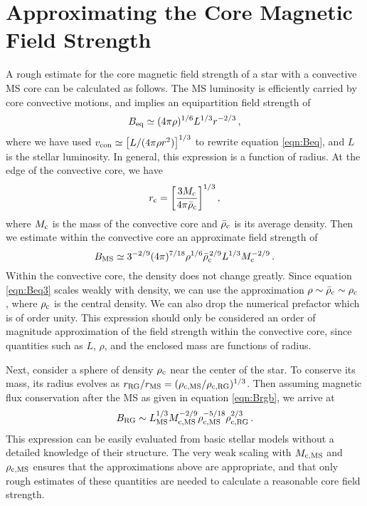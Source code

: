 \section{Approximating the Core Magnetic Field Strength}
\label{Bcenap}

A rough estimate for the core magnetic field strength of a star with a convective MS core can be calculated as follows. The MS luminosity is efficiently carried by core convective motions, and implies an equipartition field strength of 
\begin{equation}
\label{eqn:Beq2}
B_{\rm eq} \simeq (4 \pi \rho)^{1/6} L^{1/3} r^{-2/3} \, ,
\end{equation}
where we have used $v_{\rm con} \simeq \big[L/(4 \pi \rho r^2)\big]^{1/3}$ to rewrite equation \ref{eqn:Beq}, and $L$ is the stellar luminosity. In general, this expression is a function of radius. At the edge of the convective core, we have
\begin{equation}
\label{eqn:rc}
r_{\rm c} = \bigg[ \frac{3 M_{\rm c}}{4 \pi {\bar \rho}_{\rm c}} \bigg]^{1/3} \, ,
\end{equation}
where $M_{\rm c}$ is the mass of the convective core and ${\bar \rho}_{\rm c}$ is its average density. Then we estimate within the convective core an approximate field strength of
\begin{equation}
\label{eqn:Beq3}
B_{\rm MS} \simeq 3^{-2/9} (4 \pi)^{7/18} \rho^{1/6} {\bar \rho}_{\rm c}^{\, 2/9} L^{1/3} M_{\rm c}^{-2/9} \, .
\end{equation}
Within the convective core, the density does not change greatly. Since equation \ref{eqn:Beq3} scales weakly with density, we can use the approximation $\rho \sim {\bar \rho}_{\rm c} \sim \rho_{\rm c}$ , where $\rho_{\rm c}$ is the central density. We can also drop the numerical prefactor which is of order unity. This expression should only be considered an order of magnitude approximation of the field strength within the convective core, since quantities such as $L$, $\rho$, and the enclosed mass are functions of radius.

Next, consider a sphere of density $\rho_{\rm c}$ near the center of the star. To conserve its mass, its radius evolves as $r_{\rm RG}/r_{\rm MS} = (\rho_{\rm c,MS}/\rho_{\rm c,RG})^{1/3}$. Then assuming magnetic flux conservation after the MS as given in equation \ref{eqn:Brgb}, we arrive at 
\begin{equation}
\label{eqn:Bcen2}
B_{\rm RG} \sim L_{\rm MS}^{1/3} M_{\rm c,MS}^{-2/9} \rho_{\rm c,MS}^{-5/18} \rho_{\rm c,RG}^{2/3} \, .
\end{equation}
This expression can be easily evaluated from basic stellar models without a detailed knowledge of their structure. The very weak scaling with $M_{\rm c,MS}$ and $\rho_{\rm c,MS}$ ensures that the approximations above are appropriate, and that only rough estimates of these quantities are needed to calculate a reasonable core field strength.
